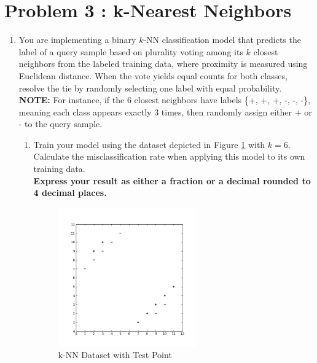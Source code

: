\documentclass[11pt,addpoints,answers]{exam}
\newcounter{subq}        %
\renewcommand{\thesubq}{(\alph{subq})}  %
\newenvironment{subquestions}{
	\setcounter{subq}{0}%
	\begin{enumerate}[
		label=\thesubq,
		leftmargin=*,
		align=left,
		itemsep=6pt
		]
	}{
	\end{enumerate}
}
\newcommand{\subquestion}{\refstepcounter{subq}\item}  %
\begin{document}
	\section*{Problem 3 : k-Nearest Neighbors}
	\begin{enumerate}[label=\alph*), itemsep=10pt]
		\item[(1)] You are implementing a binary $k$-NN classification model that predicts the label of a query sample based on plurality voting among its $k$ closest neighbors from the labeled training data, where proximity is measured using Euclidean distance. When the vote yields equal counts for both classes, resolve the tie by randomly selecting one label with equal probability.\\
		\textbf{NOTE:} For instance, if the 6 closest neighbors have labels \{+, +, +, -, -, -\}, meaning each class appears exactly 3 times, then randomly assign either + or - to the query sample. 
		
		
		\begin{subquestions}
			\subquestion Train your model using the dataset depicted in Figure \ref{fig:knn6_train} with $k=6$. Calculate the misclassification rate when applying this model to its own training data.\\ \textbf{Express your result as either a fraction or a decimal rounded to 4 decimal places.}
			
			\begin{answer_box}[title=Your answer:,height=2cm,width=5cm]
			\end{answer_box}
			
			\begin{figure}[H]
				\centering
				\includegraphics[width=0.6\textwidth]{images/Q2_knn.png}
				\caption{k-NN Dataset with Test Point} \label{fig:knn6_train}  %
			\end{figure}
			

\end{subquestions}
\end{enumerate}
\end{document}

